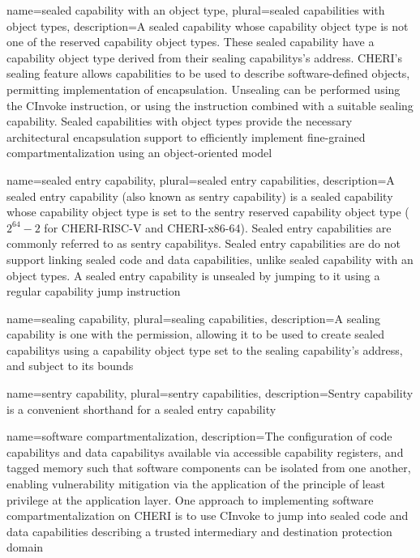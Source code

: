 {
  name=sealed capability with an object type,
  plural=sealed capabilities with object types,
  description={A \gls{sealed capability} whose \gls{capability object type}
    is not one of the \glspl{reserved capability object type}.
    These sealed capability have a \gls{capability object type} derived
    from their \glspl{sealing capability}'s \gls{address}.
    CHERI's sealing feature allows capabilities to be used to describe
    software-defined objects, permitting implementation of encapsulation.
    Unsealing can be performed using the \gls{CInvoke} instruction, or
    using the  instruction combined with a suitable
    \gls{sealing capability}.
    Sealed capabilities with object types provide the necessary architectural
    encapsulation support to efficiently implement fine-grained
    compartmentalization using an object-oriented model}
}

{
  name=sealed entry capability,
  plural=sealed entry capabilities,
  description={A sealed entry \gls{capability} (also known as
    \gls{sentry capability}) is a \gls{sealed capability}
    whose \gls{capability object type} is set to the sentry \gls{reserved capability object type} ($2^{64}-2$ for \gls{CHERI-RISC-V} and \gls{CHERI-x86-64}).
    Sealed entry capabilities are commonly referred to as \glspl{sentry
    capability}.
    Sealed entry capabilities are do not support linking sealed code and
    data capabilities, unlike \glspl{sealed capability with an object type}.
    A sealed entry capability is unsealed by jumping to it using a regular
    capability jump instruction}
}

{
  name=sealing capability,
  plural=sealing capabilities,
  description={A sealing capability is one with the \cappermSeal 
    permission, allowing it to be used to create \glspl{sealed capability}
    using a \gls{capability object type} set to the sealing capability's
    \gls{address}, and subject to its bounds}
}

{
  name=sentry capability,
  plural=sentry capabilities,
  description={Sentry capability is a convenient shorthand for a
    \gls{sealed entry capability}}
}

{
  name=software compartmentalization,
  description={The configuration of \glspl{code capability} and \glspl{data
    capability} available via accessible \glspl{capability
    register}, and \gls{tagged memory} such that software components can be
    isolated from one another, enabling \gls{vulnerability mitigation} via the
    application of the \gls{principle of least privilege} at the application
    layer.
    One approach to implementing software compartmentalization on CHERI is to
    use \gls{CInvoke} to jump into sealed code
    and data capabilities describing a trusted intermediary and destination
    protection domain}
}

